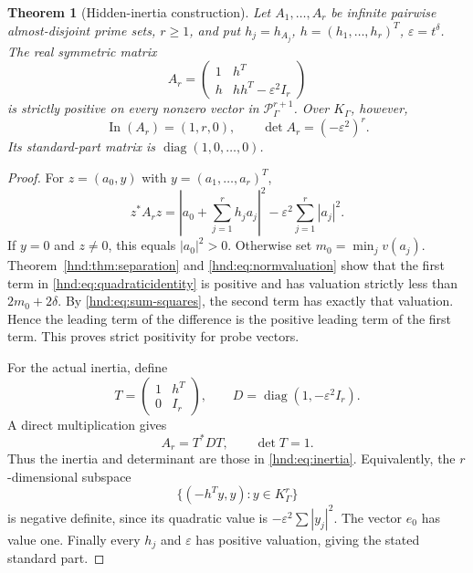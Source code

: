 \documentclass[11pt,oneside]{article}
\newtheorem{theorem}{Theorem}[section]
\theoremstyle{definition}
\theoremstyle{remark}
\newcommand{\Pfield}{\mathscr P_\Gamma}
\newcommand{\diag}{\operatorname{diag}}
\newcommand{\In}{\operatorname{In}}
\newcommand{\eps}{\varepsilon}
\begin{document}
\begin{theorem}[Hidden-inertia construction]\label{hnd:thm:inertia}
Let $A_1,\ldots,A_r$ be infinite pairwise almost-disjoint prime sets,
$r\ge1$, and put $h_j=h_{A_j}$, $h=(h_1,\ldots,h_r)^T$,
$\eps=t^\delta$. The real symmetric matrix
\[
 A_r=\begin{pmatrix}1&h^T\\h&hh^T-\eps^2I_r\end{pmatrix}
\]
is strictly positive on every nonzero vector in $\Pfield^{r+1}$.
Over $K_\Gamma$, however,
\begin{equation}\label{hnd:eq:inertia}
 \In(A_r)=(1,r,0),\qquad \det A_r=(-\eps^2)^r.
\end{equation}
Its standard-part matrix is $\diag(1,0,\ldots,0)$.
\end{theorem}
\begin{proof}
For $z=(a_0,y)$ with $y=(a_1,\ldots,a_r)^T$,
\begin{equation}\label{hnd:eq:quadraticidentity}
 z^*A_rz
 =\left|a_0+\sum_{j=1}^r h_ja_j\right|^2
  -\eps^2\sum_{j=1}^r|a_j|^2.
\end{equation}
If $y=0$ and $z\ne0$, this equals $|a_0|^2>0$.
Otherwise set $m_0=\min_jv(a_j)$.
Theorem~\ref{hnd:thm:separation} and \eqref{hnd:eq:normvaluation} show that the
first term in \eqref{hnd:eq:quadraticidentity} is positive and has valuation
strictly less than $2m_0+2\delta$. By \eqref{hnd:eq:sum-squares}, the second
term has exactly that valuation. Hence the leading term of the
difference is the positive leading term of the first term.
This proves strict positivity for probe vectors.

For the actual inertia, define
\[
 T=\begin{pmatrix}1&h^T\\0&I_r\end{pmatrix},
 \qquad D=\diag(1,-\eps^2 I_r).
\]
A direct multiplication gives
\begin{equation}\label{hnd:eq:congruence}
 A_r=T^*DT,\qquad \det T=1.
\end{equation}
Thus the inertia and determinant are those in \eqref{hnd:eq:inertia}.
Equivalently, the $r$-dimensional subspace
\[
 \{(-h^Ty,y):y\in K_\Gamma^r\}
\]
is negative definite, since its quadratic value is
$-\eps^2\sum|y_j|^2$. The vector $e_0$ has value one.
Finally every $h_j$ and $\eps$ has positive valuation, giving the stated
standard part.
\end{proof}
\end{document}
